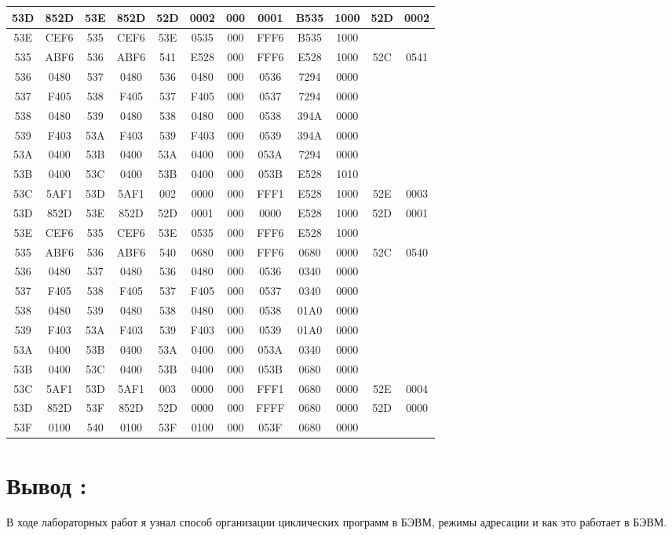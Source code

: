 \begin{center}
\begin{tabular}{|c|c|c|c|c|c|c|c|c|c|c|c|}
        \hline
        53D	& 852D	& 53E	& 852D	& 52D	& 0002	& 000	& 0001	& B535	& 1000	& 52D	& 0002 \\
        \hline
        53E	& CEF6	& 535	& CEF6	& 53E	& 0535	& 000	& FFF6	& B535	& 1000 & & \\
        \hline
        535	& ABF6	& 536	& ABF6	& 541	& E528	& 000	& FFF6	& E528	& 1000	& 52C	& 0541 \\
        \hline
        536	& 0480	& 537	& 0480	& 536	& 0480	& 000	& 0536	& 7294	& 0000 & & \\
        \hline
        537	& F405	& 538	& F405	& 537	& F405	& 000	& 0537	& 7294	& 0000 & & \\
        \hline
        538	& 0480	& 539	& 0480	& 538	& 0480	& 000	& 0538	& 394A	& 0000 & & \\
        \hline
        539	& F403	& 53A	& F403	& 539	& F403	& 000	& 0539	& 394A	& 0000 & & \\
        \hline
        53A	& 0400	& 53B	& 0400	& 53A	& 0400	& 000	& 053A	& 7294	& 0000 & & \\
        \hline
        53B	& 0400	& 53C	& 0400	& 53B 	& 0400	& 000	& 053B	& E528	& 1010 & & \\
        \hline
        53C	& 5AF1	& 53D	& 5AF1	& 002	& 0000	& 000	& FFF1	& E528	& 1000  & 52E	& 0003 \\
        \hline
        53D	& 852D	& 53E	& 852D	& 52D	& 0001	& 000	& 0000	& E528	& 1000  & 52D	& 0001 \\
        \hline
        53E	& CEF6	& 535	& CEF6	& 53E	& 0535	& 000	& FFF6	& E528	& 1000 & & \\
        \hline
        535	& ABF6	& 536	& ABF6	& 540	& 0680	& 000	& FFF6	& 0680	& 0000	& 52C	& 0540 \\
        \hline
        536	& 0480	& 537	& 0480	& 536	& 0480	& 000	& 0536	& 0340	& 0000 & & \\
        \hline
        537	& F405	& 538	& F405	& 537	& F405	& 000	& 0537	& 0340	& 0000 & & \\
        \hline
        538	& 0480	& 539	& 0480	& 538	& 0480	& 000	& 0538	& 01A0	& 0000 & & \\
        \hline
        539	& F403	& 53A	& F403	& 539	& F403	& 000	& 0539	& 01A0	& 0000 & & \\
        \hline
        53A	& 0400	& 53B	& 0400	& 53A	& 0400	& 000	& 053A	& 0340	& 0000 & & \\
        \hline
        53B	& 0400	& 53C	& 0400	& 53B	& 0400	& 000	& 053B	& 0680	& 0000 & & \\
        \hline
        53C	& 5AF1	& 53D	& 5AF1	& 003	& 0000	& 000	& FFF1	& 0680	& 0000	& 52E	& 0004 \\
        \hline
        53D	& 852D	& 53F	& 852D	& 52D	& 0000	& 000	& FFFF	& 0680	& 0000	& 52D	& 0000 \\
        \hline
        53F	& 0100	& 540	& 0100	& 53F	& 0100	& 000	& 053F	& 0680	& 0000 & & \\
        \hline
	\end{tabular}
\end{center}
\newpage
\thispagestyle{empty}
\section{\textbf{\Large{Вывод :}}}
В ходе лабораторных работ я узнал способ организации циклических программ в БЭВМ, режимы адресации и как это работает в БЭВМ.